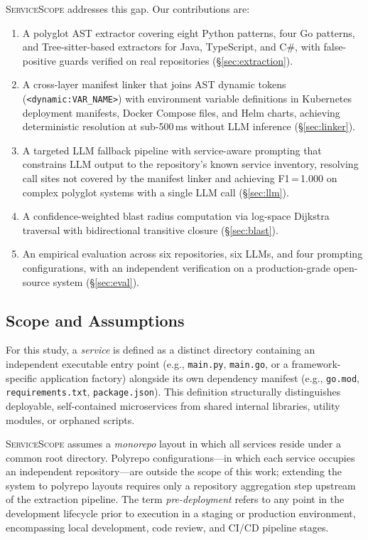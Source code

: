 \documentclass[runningheads]{llncs}
\begin{document}
\textsc{ServiceScope} addresses this gap. Our contributions are:

\begin{enumerate}
  \item A polyglot AST extractor covering eight Python patterns, four Go
    patterns, and Tree-sitter-based extractors for Java, TypeScript, and C\#,
    with false-positive guards verified on real repositories (\S\ref{sec:extraction}).
  \item A cross-layer manifest linker that joins AST dynamic tokens
    (\texttt{<dynamic:VAR\_NAME>}) with environment variable definitions in
    Kubernetes deployment manifests, Docker Compose files, and Helm charts,
    achieving deterministic resolution at sub-500\,ms without LLM inference
    (\S\ref{sec:linker}).
  \item A targeted LLM fallback pipeline with service-aware prompting that
    constrains LLM output to the repository's known service inventory,
    resolving call sites not covered by the manifest linker and achieving
    F1\,=\,1.000 on complex polyglot systems with a single LLM call
    (\S\ref{sec:llm}).
  \item A confidence-weighted blast radius computation via log-space
    Dijkstra traversal with bidirectional transitive closure (\S\ref{sec:blast}).
  \item An empirical evaluation across six repositories, six LLMs, and four
    prompting configurations, with an independent verification on a
    production-grade open-source system (\S\ref{sec:eval}).
\end{enumerate}

\subsection{Scope and Assumptions}
\label{sec:scope}

For this study, a \emph{service} is defined as a distinct directory
containing an independent executable entry point (e.g., \texttt{main.py},
\texttt{main.go}, or a framework-specific application factory) alongside
its own dependency manifest (e.g., \texttt{go.mod},
\texttt{requirements.txt}, \texttt{package.json}). This definition
structurally distinguishes deployable, self-contained microservices from
shared internal libraries, utility modules, or orphaned scripts.

\textsc{ServiceScope} assumes a \emph{monorepo} layout in which all
services reside under a common root directory. Polyrepo configurations---in
which each service occupies an independent repository---are outside the
scope of this work; extending the system to polyrepo layouts requires only
a repository aggregation step upstream of the extraction pipeline. The term
\emph{pre-deployment} refers to any point in the development lifecycle
prior to execution in a staging or production environment, encompassing
local development, code review, and CI/CD pipeline stages.
\end{document}
